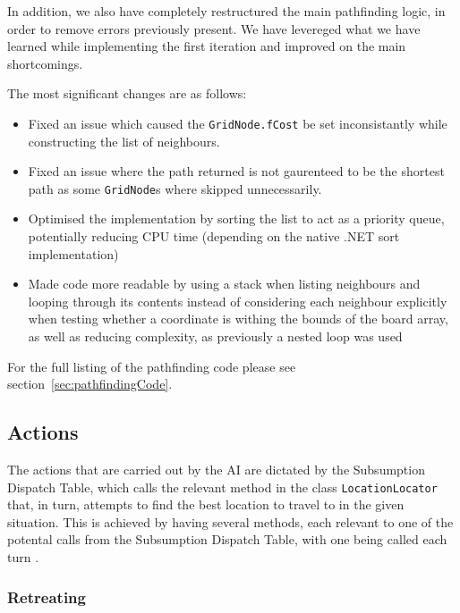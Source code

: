 \documentclass[11pt]{article}
\begin{document}
In addition, we also have completely restructured the main pathfinding logic, in order to remove errors previously present. We have levereged what we have learned while implementing the first iteration\cite{theGloriousWe} and improved on the main shortcomings.

The most significant changes are as follows:

\begin{itemize}
\item Fixed an issue which caused the \verb|GridNode.fCost| be set inconsistantly while constructing the list of neighbours.
\item Fixed an issue where the path returned is not gaurenteed to be the shortest path as some \verb|GridNode|s where skipped unnecessarily.
\item Optimised the implementation by sorting the list to act as a priority queue, potentially reducing CPU time (depending on the native .NET sort implementation)
\item Made code more readable by using a stack when listing neighbours and looping through its contents instead of considering each neighbour explicitly when testing whether a coordinate is withing the bounds of the board array, as well as reducing complexity, as previously a nested loop was used
\end{itemize}

For the full listing of the pathfinding code please see section~\ref{sec:pathfindingCode}.

\subsection{Actions} \label{sec:actions}

The actions that are carried out by the AI are dictated by the Subsumption Dispatch Table, which calls the relevant method in the class \verb|LocationLocator| that, in turn, attempts to find the best location to travel to in the given situation. This is achieved by having several methods, each relevant to one of the potental calls from the Subsumption Dispatch Table, with one being called each turn .

\subsubsection{Retreating}
\end{document}
